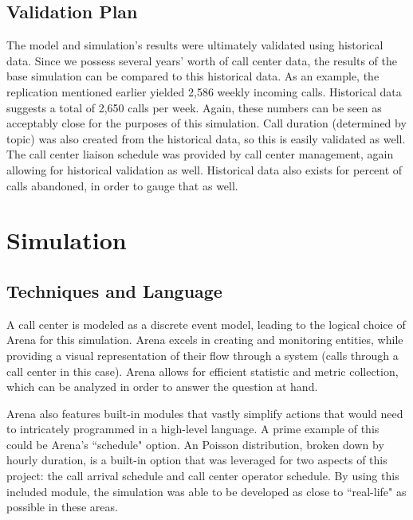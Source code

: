 \documentclass[12pt,twocolumn]{article}
\begin{document}
	
	\subsection{Validation Plan}
	
The model and simulation's results were ultimately validated using historical data.  Since we possess several years' worth of call center data, the results of the base simulation can be compared to this historical data.  As an example, the replication mentioned earlier yielded 2,586 weekly incoming calls.  Historical data suggests a total of 2,650 calls per week.  Again, these numbers can be seen as acceptably close for the purposes of this simulation.  Call duration (determined by topic) was also created from the historical data, so this is easily validated as well.  The call center liaison schedule was provided by call center management, again allowing for historical validation as well.  Historical data also exists for percent of calls abandoned, in order to gauge that as well.
	
\section{Simulation}

	\subsection{Techniques and Language}
	
A call center is modeled as a discrete event model, leading to the logical choice of Arena for this simulation.  Arena excels in creating and monitoring entities, while providing a visual representation of their flow through a system (calls through a call center in this case).  Arena allows for efficient statistic and metric collection, which can be analyzed in order to answer the question at hand.

\par

Arena also features built-in modules that vastly simplify actions that would need to intricately programmed in a high-level language.  A prime example of this could be Arena's ``schedule" option.  An Poisson distribution, broken down by hourly duration, is a built-in option that was leveraged for two aspects of this project:  the call arrival schedule and call center operator schedule.  By using this included module, the simulation was able to be developed as close to ``real-life" as possible in these areas.
	
\end{document}
